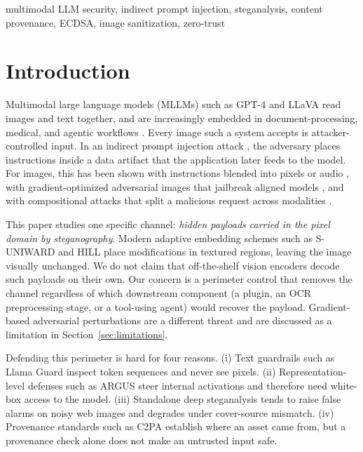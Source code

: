 \documentclass[conference]{IEEEtran}
\begin{document}
\begin{IEEEkeywords}
multimodal LLM security, indirect prompt injection, steganalysis, content provenance, ECDSA, image sanitization, zero-trust
\end{IEEEkeywords}

\section{Introduction}
\label{sec:intro}

Multimodal large language models (MLLMs) such as GPT-4 \cite{achiam2023gpt4} and LLaVA \cite{liu2023visual} read images and text together, and are increasingly embedded in document-processing, medical, and agentic workflows \cite{alayrac2022flamingo}. Every image such a system accepts is attacker-controlled input. In an indirect prompt injection attack \cite{greshake2023not}, the adversary places instructions inside a data artifact that the application later feeds to the model. For images, this has been shown with instructions blended into pixels or audio \cite{bagdasaryan2023abusing}, with gradient-optimized adversarial images that jailbreak aligned models \cite{qi2024visual, carlini2023aligned}, and with compositional attacks that split a malicious request across modalities \cite{shayegani2024jailbreak}.

This paper studies one specific channel: \textit{hidden payloads carried in the pixel domain by steganography}. Modern adaptive embedding schemes such as S-UNIWARD \cite{holub2014universal} and HILL \cite{li2014new} place modifications in textured regions, leaving the image visually unchanged. We do not claim that off-the-shelf vision encoders decode such payloads on their own. Our concern is a perimeter control that removes the channel regardless of which downstream component (a plugin, an OCR preprocessing stage, or a tool-using agent) would recover the payload. Gradient-based adversarial perturbations \cite{qi2024visual, carlini2023aligned} are a different threat and are discussed as a limitation in Section~\ref{sec:limitations}.

Defending this perimeter is hard for four reasons. (i) Text guardrails such as Llama Guard \cite{inan2023llama} inspect token sequences and never see pixels. (ii) Representation-level defenses such as ARGUS \cite{lu2024argus} steer internal activations and therefore need white-box access to the model. (iii) Standalone deep steganalysis tends to raise false alarms on noisy web images and degrades under cover-source mismatch. (iv) Provenance standards such as C2PA \cite{c2pa2023spec} establish where an asset came from, but a provenance check alone does not make an untrusted input safe.
\end{document}
